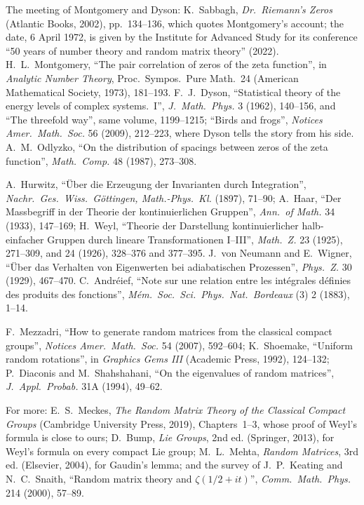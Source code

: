 The meeting of Montgomery and Dyson: K.~Sabbagh, \emph{Dr.\ Riemann's Zeros} (Atlantic Books, 2002), pp.~134--136, which quotes Montgomery's account; the date, 6 April 1972, is
given by the Institute for Advanced Study for its conference ``50 years of number theory and random matrix theory'' (2022). H.~L.~Montgomery, ``The pair correlation of zeros of the zeta function'',
in \emph{Analytic Number Theory}, Proc.\ Sympos.\ Pure Math.\ 24 (American Mathematical Society, 1973), 181--193. F.~J.~Dyson, ``Statistical theory of the energy levels of complex systems.~I'',
\emph{J.\ Math.\ Phys.} 3 (1962), 140--156, and ``The threefold way'', same volume, 1199--1215; ``Birds and frogs'', \emph{Notices Amer.\ Math.\ Soc.} 56 (2009), 212--223, where Dyson tells the
story from his side. A.~M.~Odlyzko, ``On the distribution of spacings between zeros of the zeta function'', \emph{Math.\ Comp.} 48 (1987), 273--308.

A.~Hurwitz, ``\"Uber die Erzeugung der Invarianten durch Integration'', \emph{Nachr.\ Ges.\ Wiss.\ G\"ottingen, Math.-Phys.\ Kl.} (1897), 71--90; A.~Haar, ``Der Massbegriff in der Theorie der kontinuierlichen
Gruppen'', \emph{Ann.\ of Math.} 34 (1933), 147--169; H.~Weyl, ``Theorie der Darstellung kontinuierlicher halb-einfacher Gruppen durch lineare Transformationen I--III'', \emph{Math.\ Z.} 23 (1925), 271--309, and
24 (1926), 328--376 and 377--395. J.~von Neumann and E.~Wigner, ``\"Uber das Verhalten von Eigenwerten bei adiabatischen Prozessen'', \emph{Phys.\ Z.} 30 (1929), 467--470. C.~Andr\'eief, ``Note sur une relation
entre les int\'egrales d\'efinies des produits des fonctions'', \emph{M\'em.\ Soc.\ Sci.\ Phys.\ Nat.\ Bordeaux} (3) 2 (1883), 1--14.

F.~Mezzadri, ``How to generate random matrices from the classical compact groups'', \emph{Notices Amer.\ Math.\ Soc.} 54 (2007), 592--604; K.~Shoemake, ``Uniform random rotations'', in \emph{Graphics Gems III}
(Academic Press, 1992), 124--132; P.~Diaconis and M.~Shahshahani, ``On the eigenvalues of random matrices'', \emph{J.\ Appl.\ Probab.} 31A (1994), 49--62.

For more: E.~S.~Meckes, \emph{The Random Matrix Theory of the Classical Compact Groups} (Cambridge University Press, 2019), Chapters~1--3, whose proof of Weyl's formula is close to ours;
D.~Bump, \emph{Lie Groups}, 2nd ed. (Springer, 2013), for Weyl's formula on every compact Lie group; M.~L.~Mehta, \emph{Random Matrices}, 3rd ed. (Elsevier, 2004), for Gaudin's lemma; and the survey of
J.~P.~Keating and N.~C.~Snaith, ``Random matrix theory and $\zeta(1/2+it)$'', \emph{Comm.\ Math.\ Phys.} 214 (2000), 57--89.
